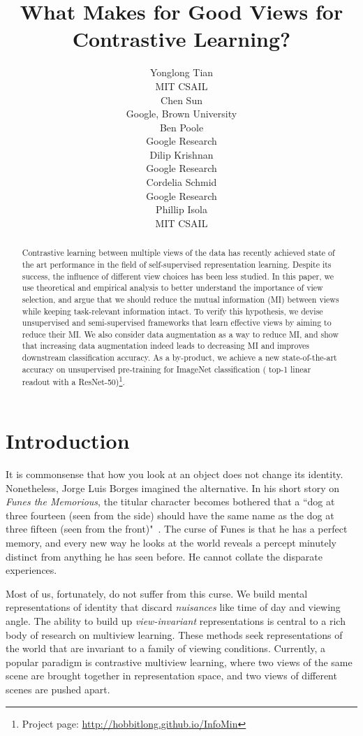 \documentclass{article}
\title{What Makes for Good Views for Contrastive Learning?}
\author{
  Yonglong Tian\\
  \;\;MIT CSAIL\\
  \And
  \;\;\;\;Chen Sun\\
  \;\;\;\;Google, Brown University\\
  \And
  Ben Poole\\
  Google Research\\
  \AND
  Dilip Krishnan\\
  Google Research\\
  \And
  Cordelia Schmid\\
  Google Research\\
  \And
  Phillip Isola\\
  MIT CSAIL\\
}
\begin{document}
\maketitle

\begin{abstract}

Contrastive learning between multiple views of the data has recently achieved state of the art performance in the field of self-supervised representation learning. Despite its success, the influence of different view choices has been less studied. In this paper, we use theoretical and empirical analysis to better understand the importance of view selection, and argue that we should reduce the mutual information (MI) between views while keeping task-relevant information intact.
To verify this hypothesis, we devise unsupervised and semi-supervised frameworks that learn effective views by aiming to reduce their MI. We also consider data augmentation as a way to reduce MI, and show that increasing data augmentation indeed leads to decreasing MI and improves downstream classification accuracy. As a by-product, we achieve a new state-of-the-art accuracy on unsupervised pre-training for ImageNet classification ( top-1 linear readout with a ResNet-50)\footnote{Project page: \url{http://hobbitlong.github.io/InfoMin}}. 

\end{abstract} 
\section{Introduction}

It is commonsense that how you look at an object does not change its identity. Nonetheless, Jorge Luis Borges imagined the alternative. In his short story on \emph{Funes the Memorious}, the titular character becomes bothered that a ``dog at three fourteen (seen from the side) should have the same name as the dog at three fifteen (seen from the front)"~\cite{borges1962funes}. The curse of Funes is that he has a perfect memory, and every new way he looks at the world reveals a percept minutely distinct from anything he has seen before. He cannot collate the disparate experiences.

Most of us, fortunately, do not suffer from this curse. We build mental representations of identity that discard \emph{nuisances} like time of day and viewing angle. The ability to build up \emph{view-invariant} representations is central to a rich body of research on multiview learning. These methods seek representations of the world that are invariant to a family of viewing conditions. Currently, a popular paradigm is contrastive multiview learning, where two views of the same scene are brought together in representation space, and two views of different scenes are pushed apart.
\end{document}
